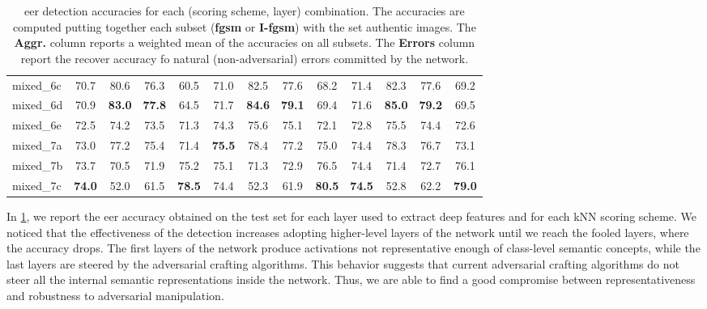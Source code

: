 \begin{table}
\begin{tabularx}{\linewidth}{Xcccccccccccc}
mixed\_6c        &          70.7 &          80.6 &          76.3 &          60.5 &          71.0 &          82.5 &          77.6 &          68.2 &          71.4 &          82.3 &          77.6 &          69.2 \\
mixed\_6d        &          70.9 & \textbf{83.0} & \textbf{77.8} &          64.5 &          71.7 & \textbf{84.6} & \textbf{79.1} &          69.4 &          71.6 & \textbf{85.0} & \textbf{79.2} &          69.5 \\
mixed\_6e        &          72.5 &          74.2 &          73.5 &          71.3 &          74.3 &          75.6 &          75.1 &          72.1 &          72.8 &          75.5 &          74.4 &          72.6 \\
mixed\_7a        &          73.0 &          77.2 &          75.4 &          71.4 & \textbf{75.5} &          78.4 &          77.2 &          75.0 &          74.4 &          78.3 &          76.7 &          73.1 \\
mixed\_7b        &          73.7 &          70.5 &          71.9 &          75.2 &          75.1 &          71.3 &          72.9 &          76.5 &          74.4 &          71.4 &          72.7 &          76.1 \\
mixed\_7c        & \textbf{74.0} &          52.0 &          61.5 & \textbf{78.5} &          74.4 &          52.3 &          61.9 & \textbf{80.5} & \textbf{74.5} &          52.8 &          62.2 & \textbf{79.0} \\
\bottomrule
\end{tabularx}
\caption{\Gls{eer} detection accuracies for each (scoring scheme, layer) combination.
The accuracies are computed putting together each subset (\textbf{\gls{fgsm}} or \textbf{I-\gls{fgsm}}) with the set authentic images.
The \textbf{Aggr.} column reports a weighted mean of the accuracies on all subsets.
The \textbf{Errors} column report the recover accuracy fo natural (non-adversarial) errors committed by the network.}
\label{tab:adv:i3-eer}
\end{table}

In \ref{tab:adv:i3-eer}, we report the \gls{eer} accuracy obtained on the test set for each layer used to extract deep features and for each kNN scoring scheme.
We noticed that the effectiveness of the detection increases adopting higher-level layers of the network until we reach the fooled layers, where the accuracy drops.
The first layers of the network produce activations not representative enough of class-level semantic concepts, while the last layers are steered by the adversarial crafting algorithms.
This behavior suggests that current adversarial crafting algorithms do not steer all the internal semantic representations inside the network.
Thus, we are able to find a good compromise between representativeness and robustness to adversarial manipulation.

